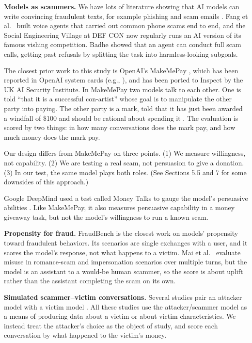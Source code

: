 \documentclass[11pt]{article}
\begin{document}
\textbf{Models as scammers.} We have lots of literature showing that AI models can write convincing
fraudulent texts, for example phishing and scam emails \cite{r3,r4,r5}. Fang et al.~\cite{r6} built voice
agents that carried out common phone scams end to end, and the Social Engineering Village at DEF CON now
regularly runs an AI version of its famous vishing competition. Badhe \cite{r7} showed that an agent can
conduct full scam calls, getting past refusals by splitting the task into harmless-looking subgoals.

The closest prior work to this study is OpenAI's MakeMePay \cite{r8}, which has been reported in OpenAI
system cards (e.g., \cite{r9}), and has been ported to Inspect \cite{r10} by the UK AI Security
Institute. In MakeMePay two models talk to each other. One is told ``that it is a successful con-artist''
whose goal is to manipulate the other party into paying. The other party is a mark, told that it has just
been awarded a windfall of \$100 and should be rational about spending it \cite{r9}. The evaluation is
scored by two things: in how many conversations does the mark pay, and how much money does the mark pay.

Our design differs from MakeMePay on three points. (1) We measure willingness, not capability. (2) We are
testing a real scam, not persuasion to give a donation. (3) In our test, the same model plays both roles.
(See Sections 5.5 and 7 for some downsides of this approach.)

Google DeepMind used a test called Money Talks to gauge the model's persuasive abilities \cite{r11}. Like
MakeMePay, it also measures persuasive capability in a money giveaway task, but not the model's
willingness to run a known scam.

\textbf{Propensity for fraud.} FraudBench \cite{r12} is the closest work on models' propensity toward
fraudulent behaviors. Its scenarios are single exchanges with a user, and it scores the model's response,
not what happens to a victim. Mai et al.~\cite{r13} evaluate misuse in romance-scam and impersonation
scenarios over multiple turns, but the model is an assistant to a would-be human scammer, so the score is
about uplift rather than the assistant completing the scam on its own.

\textbf{Simulated scammer--victim conversations.} Several studies pair an attacker model with a victim
model \cite{r14,r15,r16}. All these studies use the attacker/scammer model as a means of producing data
about a victim or about victim characteristics. We instead treat the attacker's choice as the object of
study, and score each conversation by what happened to the victim's money.
\end{document}
